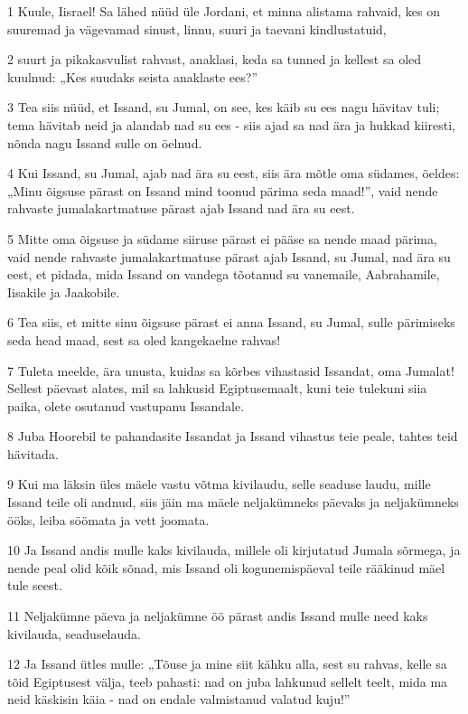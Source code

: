 \par 1 Kuule, Iisrael! Sa lähed nüüd üle Jordani, et minna alistama rahvaid, kes on suuremad ja vägevamad sinust, linnu, suuri ja taevani kindlustatuid,
\par 2 suurt ja pikakasvulist rahvast, anaklasi, keda sa tunned ja kellest sa oled kuulnud: „Kes suudaks seista anaklaste ees?”
\par 3 Tea siis nüüd, et Issand, su Jumal, on see, kes käib su ees nagu hävitav tuli; tema hävitab neid ja alandab nad su ees - siis ajad sa nad ära ja hukkad kiiresti, nõnda nagu Issand sulle on öelnud.
\par 4 Kui Issand, su Jumal, ajab nad ära su eest, siis ära mõtle oma südames, öeldes: „Minu õigsuse pärast on Issand mind toonud pärima seda maad!”, vaid nende rahvaste jumalakartmatuse pärast ajab Issand nad ära su eest.
\par 5 Mitte oma õigsuse ja südame siiruse pärast ei pääse sa nende maad pärima, vaid nende rahvaste jumalakartmatuse pärast ajab Issand, su Jumal, nad ära su eest, et pidada, mida Issand on vandega tõotanud su vanemaile, Aabrahamile, Iisakile ja Jaakobile.
\par 6 Tea siis, et mitte sinu õigsuse pärast ei anna Issand, su Jumal, sulle pärimiseks seda head maad, sest sa oled kangekaelne rahvas!
\par 7 Tuleta meelde, ära unusta, kuidas sa kõrbes vihastasid Issandat, oma Jumalat! Sellest päevast alates, mil sa lahkusid Egiptusemaalt, kuni teie tulekuni siia paika, olete osutanud vastupanu Issandale.
\par 8 Juba Hoorebil te pahandasite Issandat ja Issand vihastus teie peale, tahtes teid hävitada.
\par 9 Kui ma läksin üles mäele vastu võtma kivilaudu, selle seaduse laudu, mille Issand teile oli andnud, siis jäin ma mäele neljakümneks päevaks ja neljakümneks ööks, leiba söömata ja vett joomata.
\par 10 Ja Issand andis mulle kaks kivilauda, millele oli kirjutatud Jumala sõrmega, ja nende peal olid kõik sõnad, mis Issand oli kogunemispäeval teile rääkinud mäel tule seest.
\par 11 Neljakümne päeva ja neljakümne öö pärast andis Issand mulle need kaks kivilauda, seaduselauda.
\par 12 Ja Issand ütles mulle: „Tõuse ja mine siit kähku alla, sest su rahvas, kelle sa tõid Egiptusest välja, teeb pahasti: nad on juba lahkunud sellelt teelt, mida ma neid käskisin käia - nad on endale valmistanud valatud kuju!”
